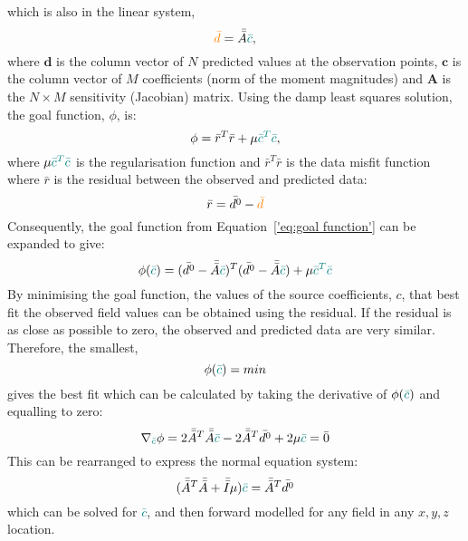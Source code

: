 which is also in the linear system,
\begin{equation}
    \textcolor{orange}{\bar{d}} = \bar{\bar{A}} \textcolor{teal}{\bar{c}},
\end{equation}
where $\mathbf{d}$ is the column vector of $N$ predicted values at the observation points, $\mathbf{c}$ is the column vector of $M$ coefficients (norm of the moment magnitudes) and $\mathbf{A}$ is the $N \times M$ sensitivity (Jacobian) matrix. Using the damp least squares solution, the goal function, $\phi$, is:
\begin{equation}
\label{'eq:goal function'}
    \phi = \bar{r}^T\bar{r} + \mu \textcolor{teal}{\bar{c}^T\bar{c}},
\end{equation}
where $\mu \textcolor{teal}{\bar{c}^T\bar{c}}$ is the regularisation function and  $\bar{r}^T\bar{r}$ is the data misfit function where $\bar{r}$ is the residual between the observed and predicted data:
\begin{equation}
    \bar{r} = \bar{d^0} - \textcolor{orange}{\bar{d}}
\end{equation}
Consequently, the goal function from Equation~\ref{'eq:goal function'} can  be expanded to give:
\begin{equation}
    \phi (\textcolor{teal}{\bar{c}}) = (\bar{d^0} - \Bar{\Bar{A}} \textcolor{teal}{\Bar{c}})^T (\bar{d^0} - \Bar{\Bar{A}} \textcolor{teal}{\Bar{c}}) + \mu \textcolor{teal}{\bar{c}^T\bar{c}}
\end{equation}
By minimising the goal function, the values of the source coefficients, $c$, that best fit the observed field values can be obtained using the residual. If the residual is as close as possible to zero, the observed and predicted data are very similar. Therefore, the smallest,
\begin{equation}
    \phi(\textcolor{teal}{\bar{c}}) = min
\end{equation}
gives the best fit which can be calculated by taking the derivative of $\phi(\textcolor{teal}{\bar{c}})$ and equalling to zero:
\begin{equation}
    \nabla_{\textcolor{teal}{\bar{c}}} \phi = 2 \Bar{\Bar{A}}^T \Bar{\Bar{A}} \textcolor{teal}{\Bar{c}} - 2\Bar{\Bar{A}}^T\bar{d^0} + 2\mu \textcolor{teal}{\bar{c}} = \bar{0}
\end{equation}
This can be rearranged to express the normal equation system:
\begin{equation}
    (\Bar{\Bar{A}}^T \Bar{\Bar{A}} + \Bar{\Bar{I}} \mu ) \textcolor{teal}{\bar{c}} = 
    \Bar{\Bar{A}}^T\bar{d^0}
\end{equation}
which can be solved for \textcolor{teal}{$\bar{c}$}, and then forward modelled for any field in any $x, y, z$ location.

